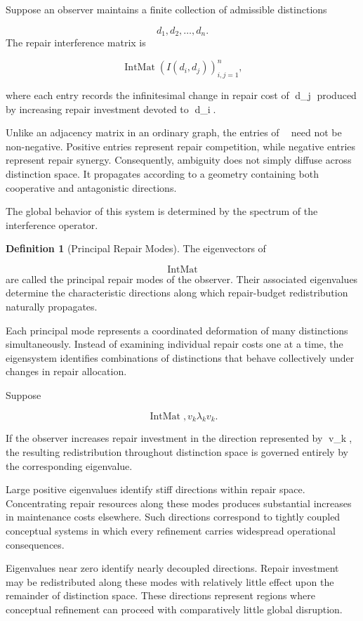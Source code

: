 \documentclass[12pt,oneside]{article}
\theoremstyle{plain}
\theoremstyle{definition}
\newtheorem{definition}[theorem]{Definition}
\theoremstyle{remark}
\DeclareMathOperator{\IntMat}{IntMat}
\begin{document}
Suppose an observer maintains a finite collection of admissible distinctions

\[
{d_1,d_2,\ldots,d_n}.
\]
The repair interference matrix is

\[
\IntMat
\left(
I(d_i,d_j)
\right)_{i,j=1}^{n},
\]

where each entry records the infinitesimal change in repair cost of d_j produced by increasing repair investment devoted to d_i.

Unlike an adjacency matrix in an ordinary graph, the entries of \IntMat need not be non-negative. Positive entries represent repair competition, while negative entries represent repair synergy. Consequently, ambiguity does not simply diffuse across distinction space. It propagates according to a geometry containing both cooperative and antagonistic directions.

The global behavior of this system is determined by the spectrum of the interference operator.

\begin{definition}[Principal Repair Modes]
The eigenvectors of

\[
\IntMat
\]
are called the principal repair modes of the observer. Their associated eigenvalues determine the characteristic directions along which repair-budget redistribution naturally propagates.
\end{definition}

Each principal mode represents a coordinated deformation of many distinctions simultaneously. Instead of examining individual repair costs one at a time, the eigensystem identifies combinations of distinctions that behave collectively under changes in repair allocation.

Suppose

\[
\IntMat,v_k
\lambda_k v_k.
\]

If the observer increases repair investment in the direction represented by v_k, the resulting redistribution throughout distinction space is governed entirely by the corresponding eigenvalue.

Large positive eigenvalues identify stiff directions within repair space. Concentrating repair resources along these modes produces substantial increases in maintenance costs elsewhere. Such directions correspond to tightly coupled conceptual systems in which every refinement carries widespread operational consequences.

Eigenvalues near zero identify nearly decoupled directions. Repair investment may be redistributed along these modes with relatively little effect upon the remainder of distinction space. These directions represent regions where conceptual refinement can proceed with comparatively little global disruption.
\end{document}
